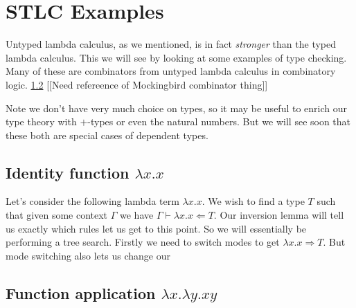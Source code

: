 \section{STLC Examples}

%


Untyped lambda calculus, as we mentioned, is in fact \emph{stronger} than the typed lambda calculus. This we will see by looking at some examples of type checking. Many of these are combinators from untyped lambda calculus in combinatory logic. \ref{} [[Need refereence of Mockingbird combinator thing]]

Note we don't have very much choice on types, so it may be useful to enrich our type theory with $+$-types or even the natural numbers. But we will see soon that these both are special cases of dependent types.

\subsection{Identity function $\lambda x . x$}

\begin{example}
    Let's consider the following lambda term $\lambda x . x$. We wish to find a type $T$ such that given some context $\Gamma$ we have $\Gamma \vdash \lambda x . x \Leftarrow T$. Our inversion lemma will tell us exactly which rules let us get to this point. So we will essentially be performing a tree search. Firstly we need to switch modes to get $\lambda x . x \Rightarrow T$. But mode switching also lets us change our 
    \begin{prooftree}
    \end{prooftree}
\end{example}

\subsection{Function application $\lambda x . \lambda y . x y$}

